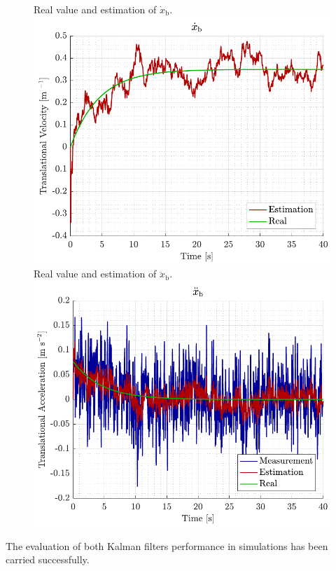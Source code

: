 \begin{figure}[H]
    \captionbox 
    {   
        Real value and estimation of $\dot{x}_\mathrm{b}$.
        \label{fig:sim_xbdot}
    }                                                                 
    {                                                                  
        \includegraphics[width=.45\textwidth]{figures/sim_xbdot}         
    }                                                                    
    \hspace{5pt}                                                          
    \captionbox  
    {      
        Real value and estimation of $\ddot{x}_\mathrm{b}$.
        \label{fig:sim_xbddot}
    }                                                                          
    {
        \includegraphics[width=.45\textwidth]{figures/sim_xbddot}
    }
\end{figure}

The evaluation of both Kalman filters performance in simulations has been carried successfully.
